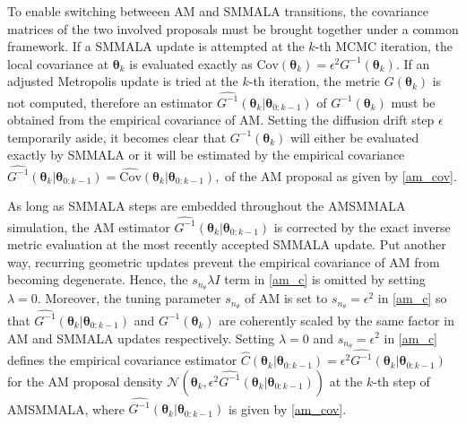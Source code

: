 \documentclass[twoside,11pt]{article}
\begin{document}
To enable switching betweeen AM and SMMALA transitions, the covariance matrices of the two involved proposals must be brought
together under a common framework. If a SMMALA update is attempted at the $k$-th MCMC iteration, the local covariance at
$\boldsymbol{\theta}_k$ is evaluated exactly as
$\mbox{Cov}(\boldsymbol{\theta}_{k})=\epsilon^2 G^{-1}(\boldsymbol{\theta}_{k})$. If an adjusted Metropolis update is 
tried at the $k$-th iteration, the metric $G(\boldsymbol{\theta}_{k})$ is not computed, therefore an estimator
$\widehat{G^{-1}}(\boldsymbol{\theta}_{k}|\boldsymbol{\theta}_{0:k-1})$ of $G^{-1}(\boldsymbol{\theta}_{k})$ must be 
obtained from the empirical covariance of AM. Setting the diffusion drift step $\epsilon$ temporarily aside, it becomes 
clear that $G^{-1}(\boldsymbol{\theta}_{k})$ will either be evaluated exactly by SMMALA or it will be estimated by the 
empirical covariance
$
\widehat{G^{-1}}(\boldsymbol{\theta}_{k}|\boldsymbol{\theta}_{0:k-1})=
\widehat{\mbox{Cov}}(\boldsymbol{\theta}_{k}|\boldsymbol{\theta}_{0:k-1}),
$
of the AM proposal as given by \eqref{am_cov}.

As long as SMMALA steps are embedded throughout the AMSMMALA simulation, the AM estimator
$\widehat{G^{-1}}(\boldsymbol{\theta}_{k}|\boldsymbol{\theta}_{0:k-1})$ is corrected by the exact inverse metric evaluation 
at the most recently accepted SMMALA update. Put another way, recurring geometric updates prevent the empirical covariance of
AM from becoming degenerate. Hence, the $s_{n_{\theta}}\lambda I$ term in \eqref{am_c} is omitted by setting $\lambda=0$.
Moreover, the tuning parameter $s_{n_{\theta}}$ of AM is set to $s_{n_{\theta}}=\epsilon^2$ in \eqref{am_c} so that
$\widehat{G^{-1}}(\boldsymbol{\theta}_{k}|\boldsymbol{\theta}_{0:k-1})$ and $G^{-1}(\boldsymbol{\theta}_k)$ are coherently
scaled by the same factor in AM and SMMALA updates respectively. Setting $\lambda=0$ and $s_{n_{\theta}}=\epsilon^2$ in
\eqref{am_c} defines the empirical covariance estimator
$\hat{C}(\boldsymbol{\theta}_{k}|\boldsymbol{\theta}_{0:k-1})=
\epsilon^2\widehat{G^{-1}}(\boldsymbol{\theta}_{k}|\boldsymbol{\theta}_{0:k-1})$
for the AM proposal density
$\mathcal{N}(\boldsymbol{\theta}_{k}, \epsilon^2\widehat{G^{-1}}(\boldsymbol{\theta}_{k}|\boldsymbol{\theta}_{0:k-1}))$
at the $k$-th step of AMSMMALA, where $\widehat{G^{-1}}(\boldsymbol{\theta}_{k}|\boldsymbol{\theta}_{0:k-1})$ is given by 
\eqref{am_cov}.
\end{document}
